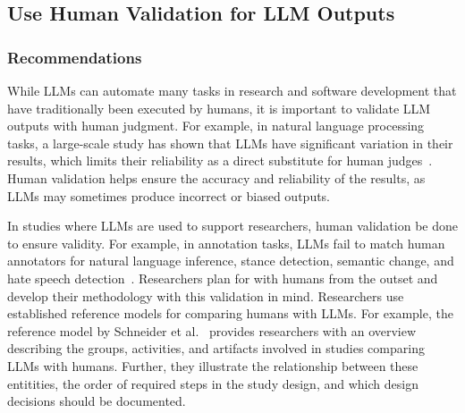 



\subsection{Use Human Validation for LLM Outputs}

\subsubsection{Recommendations}


While LLMs can automate many tasks in research and software development that have traditionally been executed by humans, it is important to validate LLM outputs with human judgment.
For example, in natural language processing tasks, a large-scale study has shown that LLMs have significant variation in their results, which limits their reliability as a direct substitute for human judges~\cite{DBLP:journals/corr/abs-2406-18403}. 
Human validation helps ensure the accuracy and reliability of the results, as LLMs may sometimes produce incorrect or biased outputs.

In studies where LLMs are used to support researchers, human validation \must be done to ensure validity.
For example, in annotation tasks, LLMs fail to match human annotators for natural language inference, stance detection, semantic change, and hate speech detection~\cite{DBLP:conf/chi/Wang0RMM24}.
Researchers \should plan for with humans from the outset and develop their methodology with this validation in mind.
Researchers \should use established reference models for comparing humans with LLMs.
For example, the reference model by Schneider et al.~\cite{Schneider2025ReferenceModel} provides researchers with an overview describing the groups, activities, and artifacts involved in studies comparing LLMs with humans.
Further, they illustrate the relationship between these entitities, the order of required steps in the study design, and which design decisions should be documented.

